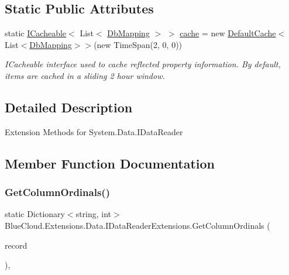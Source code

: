 \subsection*{Static Public Attributes}
\begin{DoxyCompactItemize}
\item 
static \mbox{\hyperlink{interface_blue_cloud_1_1_extensions_1_1_cache_1_1_i_cacheable}{I\+Cacheable}}$<$ List$<$ \mbox{\hyperlink{class_blue_cloud_1_1_extensions_1_1_data_1_1_db_mapping}{Db\+Mapping}} $>$ $>$ \mbox{\hyperlink{class_blue_cloud_1_1_extensions_1_1_data_1_1_i_data_reader_extensions_aec5e45db6160d2502c2eceead22b1a83}{cache}} = new \mbox{\hyperlink{class_blue_cloud_1_1_extensions_1_1_cache_1_1_default_cache}{Default\+Cache}}$<$List$<$\mbox{\hyperlink{class_blue_cloud_1_1_extensions_1_1_data_1_1_db_mapping}{Db\+Mapping}}$>$$>$(new Time\+Span(2, 0, 0))
\begin{DoxyCompactList}\small\item\em I\+Cacheable interface used to cache reflected property information. By default, items are cached in a sliding 2 hour window. \end{DoxyCompactList}\end{DoxyCompactItemize}


\subsection{Detailed Description}
Extension Methods for System.\+Data.\+I\+Data\+Reader 



\subsection{Member Function Documentation}
\mbox{\label{class_blue_cloud_1_1_extensions_1_1_data_1_1_i_data_reader_extensions_a6f7b4f6e3b78a8a6eea6bcd8927c5531}} 
\subsubsection{\texorpdfstring{Get\+Column\+Ordinals()}{GetColumnOrdinals()}}
{\footnotesize\ttfamily static Dictionary$<$string, int$>$ Blue\+Cloud.\+Extensions.\+Data.\+I\+Data\+Reader\+Extensions.\+Get\+Column\+Ordinals (\begin{DoxyParamCaption}\item[{this I\+Data\+Record}]{record }\end{DoxyParamCaption})\hspace{0.3cm}{\ttfamily [inline]}, {\ttfamily [static]}}



